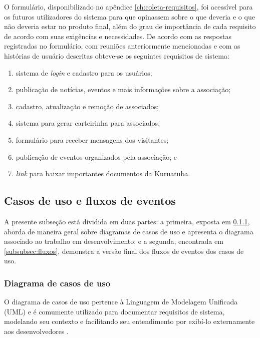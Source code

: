 O formulário, disponibilizado no apêndice \ref{ch:coleta-requisitos}, foi acessível para os futuros utilizadores do sistema para que opinassem sobre o que deveria e o que não deveria estar no produto final, além do grau de importância de cada requisito de acordo com suas exigências e necessidades. De acordo com as respostas registradas no formulário, com reuniões anteriormente mencionadas e com as histórias de usuário descritas obteve-se os seguintes requisitos de sistema:

\begin{enumerate}
 \item sistema de \textit{login} e cadastro para os usuários;
 \item publicação de notícias, eventos e mais informações sobre a associação;
 \item cadastro, atualização e remoção de associados;
 \item sistema para gerar carteirinha para associados;
 \item formulário para receber mensagens dos visitantes;
 \item publicação de eventos organizados pela associação; e
 \item \textit{link} para baixar importantes documentos da Kuruatuba.
\end{enumerate}


\hspace{2.5cm}
\subsection{Casos de uso e fluxos de eventos}
\label{subsec:usecase}
\hspace{2.5cm}

A presente subseção está dividida em duas partes: a primeira, exposta em \ref{subsubsec:casos-uso}, aborda de maneira geral sobre diagramas de casos de uso e apresenta o diagrama associado ao trabalho em desenvolvimento; e a segunda, encontrada em \ref{subsubsec:fluxos}, demonstra a versão final dos fluxos de eventos dos casos de uso.

\hspace{2.5cm}
\subsubsection{Diagrama de casos de uso}
\label{subsubsec:casos-uso}
\hspace{2.5cm}

O diagrama de casos de uso pertence à Linguagem de Modelagem Unificada (UML) e é comumente utilizado para documentar requisitos de sistema, modelando seu contexto e facilitando seu entendimento por exibí-lo externamente aos desenvolvedores \cite{de2001diagramas}.

